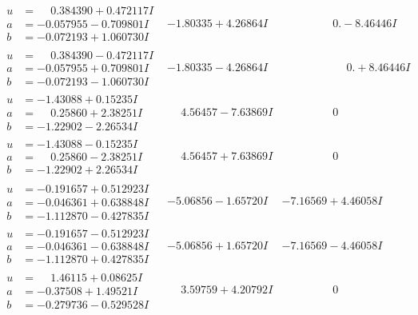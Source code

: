 \documentclass[1p]{elsarticle_modified}
\theoremstyle{definition}
\begin{document}
$$\begin{array}{c|c|c}
\begin{aligned}
u &= \phantom{-}0.384390 + 0.472117 I \\
a &= -0.057955 - 0.709801 I \\
b &= -0.072193 + 1.060730 I\end{aligned}
 & -1.80335 + 4.26864 I & \phantom{-0.000000 } 0. - 8.46446 I \\ \hline\begin{aligned}
u &= \phantom{-}0.384390 - 0.472117 I \\
a &= -0.057955 + 0.709801 I \\
b &= -0.072193 - 1.060730 I\end{aligned}
 & -1.80335 - 4.26864 I & \phantom{-0.000000 -}0. + 8.46446 I \\ \hline\begin{aligned}
u &= -1.43088 + 0.15235 I \\
a &= \phantom{-}0.25860 + 2.38251 I \\
b &= -1.22902 - 2.26534 I\end{aligned}
 & \phantom{-}4.56457 - 7.63869 I & \phantom{-0.000000 } 0 \\ \hline\begin{aligned}
u &= -1.43088 - 0.15235 I \\
a &= \phantom{-}0.25860 - 2.38251 I \\
b &= -1.22902 + 2.26534 I\end{aligned}
 & \phantom{-}4.56457 + 7.63869 I & \phantom{-0.000000 } 0 \\ \hline\begin{aligned}
u &= -0.191657 + 0.512923 I \\
a &= -0.046361 + 0.638848 I \\
b &= -1.112870 - 0.427835 I\end{aligned}
 & -5.06856 - 1.65720 I & -7.16569 + 4.46058 I \\ \hline\begin{aligned}
u &= -0.191657 - 0.512923 I \\
a &= -0.046361 - 0.638848 I \\
b &= -1.112870 + 0.427835 I\end{aligned}
 & -5.06856 + 1.65720 I & -7.16569 - 4.46058 I \\ \hline\begin{aligned}
u &= \phantom{-}1.46115 + 0.08625 I \\
a &= -0.37508 + 1.49521 I \\
b &= -0.279736 - 0.529528 I\end{aligned}
 & \phantom{-}3.59759 + 4.20792 I & \phantom{-0.000000 } 0\\

\end{array}$$
\end{document}

